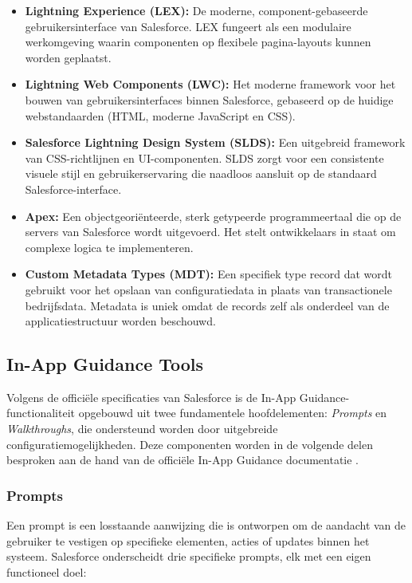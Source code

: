 \begin{itemize}
	\item \textbf{Lightning Experience (LEX):} De moderne, component-gebaseerde gebruikersinterface van Salesforce. LEX fungeert als een modulaire werkomgeving waarin componenten op flexibele pagina-layouts kunnen worden geplaatst.
	
	\item \textbf{Lightning Web Components (LWC):} Het moderne framework voor het bouwen van gebruikersinterfaces binnen Salesforce, gebaseerd op de huidige webstandaarden (HTML, moderne JavaScript en CSS).
	
	\item \textbf{Salesforce Lightning Design System (SLDS):} Een uitgebreid framework van CSS-richtlijnen en UI-componenten. SLDS zorgt voor een consistente visuele stijl en gebruikerservaring die naadloos aansluit op de standaard Salesforce-interface.
	
	\item \textbf{Apex:} Een objectgeoriënteerde, sterk getypeerde programmeertaal die op de servers van Salesforce wordt uitgevoerd. Het stelt ontwikkelaars in staat om complexe logica te implementeren.
	
	\item \textbf{Custom Metadata Types (MDT):} Een specifiek type record dat wordt gebruikt voor het opslaan van configuratiedata in plaats van transactionele bedrijfsdata. Metadata is uniek omdat de records zelf als onderdeel van de applicatiestructuur worden beschouwd.
	
\end{itemize}

\subsection{In-App Guidance Tools}

Volgens de officiële specificaties van Salesforce is de In-App Guidance-functionaliteit opgebouwd uit twee fundamentele hoofdelementen: \textit{Prompts} en \textit{Walkthroughs}, die ondersteund worden door uitgebreide configuratiemogelijkheden. Deze componenten worden in de volgende delen besproken aan de hand van de officiële In-App Guidance documentatie \autocite{SalesforceIAG}.

\subsubsection{Prompts}
Een prompt is een losstaande aanwijzing die is ontworpen om de aandacht van de gebruiker te vestigen op specifieke elementen, acties of updates binnen het systeem. Salesforce onderscheidt drie specifieke prompts, elk met een eigen functioneel doel:

